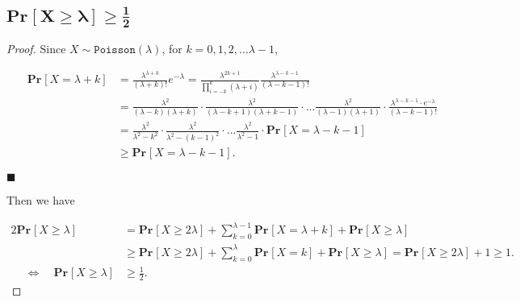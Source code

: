 \documentclass{article}
\renewcommand{\qedsymbol}{\hfill $\blacksquare$\par}
\renewcommand{\Pr}[2]{\mathbf{Pr}_{#1}\left[#2\right]}
\begin{document}
\subsection{$\boldsymbol{\Pr{}{X\geq\lambda}\geq\frac{1}{2}}$}
\vspace{1em}
\begin{proof}
    Since $X\sim\mathtt{Poisson}(\lambda)$, for $k=0,1,2,...\lambda-1$,
    
    \vspace{-2em}
    \begin{align*}
        \quad\ \ \Pr{}{X=\lambda+k} &= \frac{\lambda^{\lambda+k}}{(\lambda+k)!}e^{-\lambda} = \frac{\lambda^{2k+1}}{\prod_{i=-k}^k(\lambda+i)}\frac{\lambda^{\lambda-k-1}}{(\lambda-k-1)!} \\
        &= \frac{\lambda^2}{(\lambda-k)(\lambda+k)}\cdot\frac{\lambda^2}{(\lambda-k+1)(\lambda+k-1)}\cdot...\frac{\lambda^2}{(\lambda-1)(\lambda+1)}\cdot\frac{\lambda^{\lambda-k-1}\cdot e^{-\lambda}}{(\lambda-k-1)!}\\
        &= \frac{\lambda^2}{\lambda^2-k^2}\cdot\frac{\lambda^2}{\lambda^2-(k-1)^2}\cdot...\frac{\lambda^2}{\lambda^2-1}\cdot\Pr{}{X=\lambda-k-1} \\
        & \geq \Pr{}{X=\lambda-k-1}.
    \end{align*}
    
    \vspace{-3.3em} \qedsymbol
    
    \vspace{0.8em} \hspace{1.3em}
    Then we have
    
    \vspace{-2.5em}
    \begin{align*}
        2\Pr{}{X\geq\lambda} &= \Pr{}{X\geq2\lambda}+\sum_{k=0}^{\lambda-1}\Pr{}{X=\lambda+k}+\Pr{}{X\geq\lambda} \\
        &\geq \Pr{}{X\geq2\lambda}+\sum_{k=0}^\lambda \Pr{}{X=k}+\Pr{}{X\geq\lambda} = \Pr{}{X\geq2\lambda}+1 \geq 1.\\
        \quad\ \Longleftrightarrow \quad \Pr{}{X\geq\lambda}&\geq\frac{1}{2}.
    \end{align*}
    
    \vspace{-3em}
\end{proof}

\vspace{1em}
\end{document}
